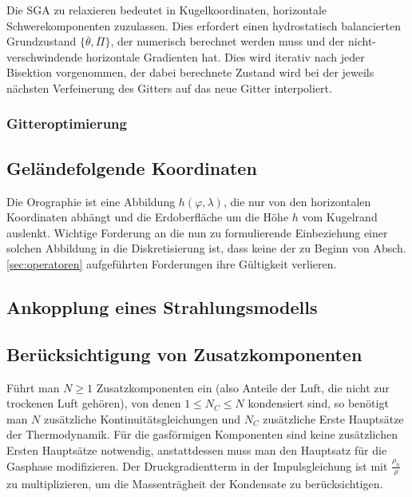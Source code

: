 \documentclass{book}
\newcommand\newoverline[1]{%
\overline{#1}}
\begin{document}
Die SGA zu relaxieren bedeutet in Kugelkoordinaten, horizontale Schwerekomponenten zuzulassen. Dies erfordert einen hydrostatisch balancierten Grundzustand $\{\newoverline{\theta}, \newoverline{\Pi}\}$, der numerisch berechnet werden muss und der nicht-verschwindende horizontale Gradienten hat. Dies wird iterativ nach jeder Bisektion vorgenommen, der dabei berechnete Zustand wird bei der jeweils nächsten Verfeinerung des Gitters auf das neue Gitter interpoliert.

\subsubsection{Gitteroptimierung}
\label{sec:gitteroptimierung}

\subsection{Geländefolgende Koordinaten}
\label{sec:geländefolgende_koordinaten}

Die Orographie ist eine Abbildung $h\left(\varphi,\lambda\right)$, die nur von den horizontalen Koordinaten abhängt und die Erdoberfläche um die Höhe $h$ vom Kugelrand auslenkt. Wichtige Forderung an die nun zu formulierende Einbeziehung einer solchen Abbildung in die Diskretisierung ist, dass keine der zu Beginn von Absch. \ref{sec:operatoren} aufgeführten Forderungen ihre Gültigkeit verlieren.

\subsection{Ankopplung eines Strahlungsmodells}
\label{sec:ankopplung_an_ein_strahliungsmodells}

\subsection{Berücksichtigung von Zusatzkomponenten}
\label{sec:berücksichtigung_von_zusatzkomponenten}

Führt man $N \geq 1$ Zusatzkomponenten ein (also Anteile der Luft, die nicht zur trockenen Luft gehören), von denen $1 \leq N_C \leq N$ kondensiert sind, so benötigt man $N$ zusätzliche Kontinuitätsgleichungen und $N_C$ zusätzliche Erste Hauptsätze der Thermodynamik. Für die gasförmigen Komponenten sind keine zusätzlichen Ersten Hauptsätze notwendig, anstattdessen muss man den Hauptsatz für die Gasphase modifizieren. Der Druckgradientterm in der Impulsgleichung ist mit $\frac{\rho_h}{\rho}$ zu multiplizieren, um die Massenträgheit der Kondensate zu berücksichtigen.
\end{document}
